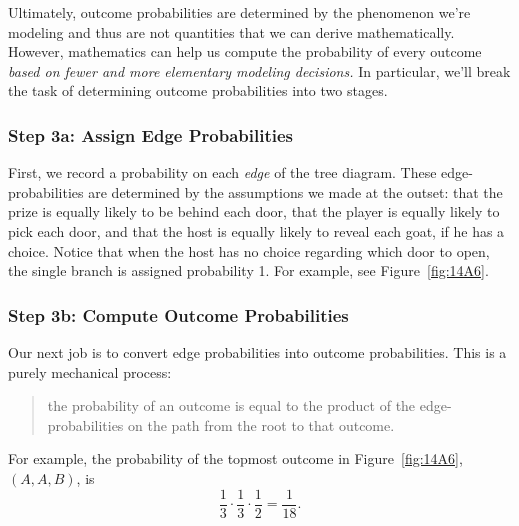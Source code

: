 Ultimately, outcome probabilities are determined by the phenomenon
we're modeling and thus are not quantities that we can derive
mathematically.  However, mathematics can help us compute the
probability of every outcome \emph{based on fewer and more
elementary modeling decisions.}  In particular, we'll break the task
of determining outcome probabilities into two stages.

\subsubsection{Step 3a: Assign Edge Probabilities}

First, we record a probability on each \emph{edge} of the tree
diagram.  These edge-probabilities are determined by the assumptions
we made at the outset: that the prize is equally likely to be behind
each door, that the player is equally likely to pick each door, and
that the host is equally likely to reveal each goat, if he has a
choice.  Notice that when the host has no choice regarding which door
to open, the single branch is assigned probability 1.  For example,
see Figure~\ref{fig:14A6}.
\iffalse

\begin{figure}

\graphic{Monty5}

\caption{The tree diagram for the Monty Hall Problem where edge
  weights denote the probability of that branch being taken, given that
  we are at the parent of that branch.  For example, if the car is
  behind door~$A$, then there is a 1/3~chance that the player's
  initial selection is door~$B$.}

\label{fig:14A5}

\end{figure}
\fi

\subsubsection{Step 3b: Compute Outcome Probabilities}

Our next job is to convert edge probabilities into outcome
probabilities.  This is a purely mechanical process:
\begin{quote}
the probability of an outcome is equal to the product of the
edge-probabilities on the path from the root to that outcome.
\end{quote}
For example, the probability of the topmost outcome in
Figure~\ref{fig:14A6}, $(A, A, B)$, is
\[
\frac{1}{3} \cdot \frac{1}{3} \cdot \frac{1}{2} = \frac{1}{18}.
\]

